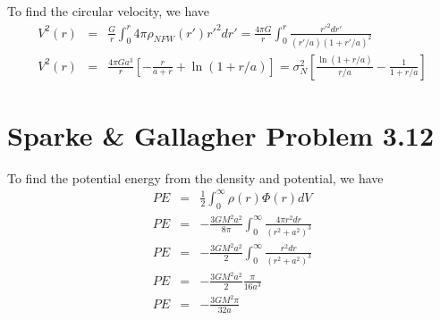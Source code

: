 \documentclass[]{article}
\begin{document}
\noindent
To find the circular velocity, we have
\begin{eqnarray}
V^2(r) &=& \frac{G}{r} \int_{0}^{r} 4\pi \rho_{NFW}(r')r'^2 dr' = \frac{4\pi G}{r} \int_{0}^{r} \frac{r'^2dr'}{(r'/a)(1+r'/a)^2} \\
V^2(r) &=& \frac{4\pi G a^3}{r} \left[ -\frac{r}{a+r} + \ln(1+r/a)\right] = \sigma_N^2 \left[  \frac{\ln(1+r/a)}{r/a} -\frac{1}{1+r/a} \right]
\end{eqnarray}

\section{Sparke \& Gallagher Problem 3.12}

To find the potential energy from the density and potential, we have
\begin{eqnarray}
PE &=& \frac{1}{2} \int_0^{\infty} \rho(r) \Phi(r) dV\\
PE &=& -\frac{3GM^2 a^2}{8\pi} \int_0^{\infty}  \frac{4\pi r^2 dr}{(r^2 +a^2)^{3}}\\
PE &=& -\frac{3GM^2 a^2}{2} \int_0^{\infty}  \frac{ r^2 dr}{(r^2 +a^2)^{3}}\\
PE &=& -\frac{3GM^2 a^2}{2} \frac{\pi}{16a^3}\\
PE &=& -\frac{3GM^2 \pi}{32 a}
\end{eqnarray}
\end{document}
